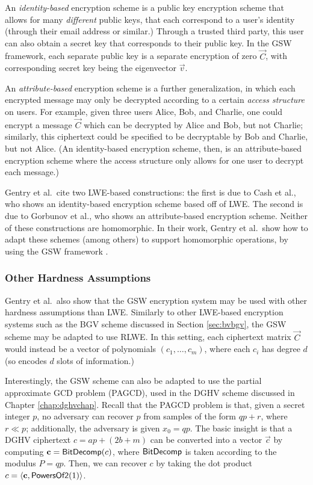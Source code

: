     An \emph{identity-based} encryption scheme is a public key encryption scheme that allows for many \emph{different} public keys, that each correspond to a user's identity (through their email address or similar.) Through a trusted third party, this user can also obtain a secret key that corresponds to their public key. In the GSW framework, each separate public key is a separate encryption of zero $\vec{C}$, with corresponding secret key being the eigenvector $\vec{v}$.

    An \emph{attribute-based} encryption scheme is a further generalization, in which each encrypted message may only be decrypted according to a certain \emph{access structure} on users. For example, given three users Alice, Bob, and Charlie, one could encrypt a message $\vec{C}$ which can be decrypted by Alice and Bob, but not Charlie; similarly, this ciphertext could be specified to be decryptable by Bob and Charlie, but not Alice. (An identity-based encryption scheme, then, is an attribute-based encryption scheme where the access structure only allows for one user to decrypt each message.)

    Gentry et al.~cite two LWE-based constructions: the first is due to Cash et al., who shows an identity-based encryption scheme based off of LWE. The second is due to Gorbunov et al., who shows an attribute-based encryption scheme. Neither of these constructions are homomorphic. In their work, Gentry et al.~show how to adapt these schemes (among others) to support homomorphic operations, by using the GSW framework \cite{gsw}.

    \subsubsection{Other Hardness Assumptions}
    Gentry et al.~also show that the GSW encryption system may be used with other hardness assumptions than LWE. Similarly to other LWE-based encryption systems such as the BGV scheme discussed in Section \ref{sec:bvbgv}, the GSW scheme may be adapted to use RLWE. In this setting, each ciphertext matrix $\vec{C}$ would instead be a vector of polynomials $(c_1, \dots, c_m)$, where each $c_i$ has degree $d$ (so encodes $d$ slots of information.)

    Interestingly, the GSW scheme can also be adapted to use the partial approximate GCD problem (PAGCD), used in the DGHV scheme discussed in Chapter \ref{chap:dghvchap}. Recall that the PAGCD problem is that, given a secret integer $p$, no adversary can recover $p$ from samples of the form $qp + r$, where $r \ll p$; additionally, the adversary is given $x_0 = qp$. The basic insight is that a DGHV ciphertext $c = ap + (2b + m)$ can be converted into a vector $\vec{c}$ by computing $\vec{c} = {\sf BitDecomp}(c)$, where ${\sf BitDecomp}$ is taken according to the modulus $P = qp$. Then, we can recover $c$ by taking the dot product $c = \langle \vec{c}, {\sf PowersOf2}(1) \rangle$.

